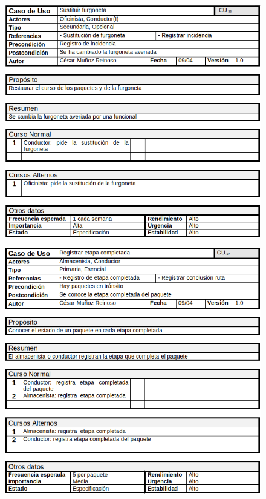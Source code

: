 \begin{figure}[H]
	\centering
	\includegraphics[width=16cm]{36}
\end{figure}
\begin{figure}[H]
	\centering
	\includegraphics[width=16cm]{37}
\end{figure}
